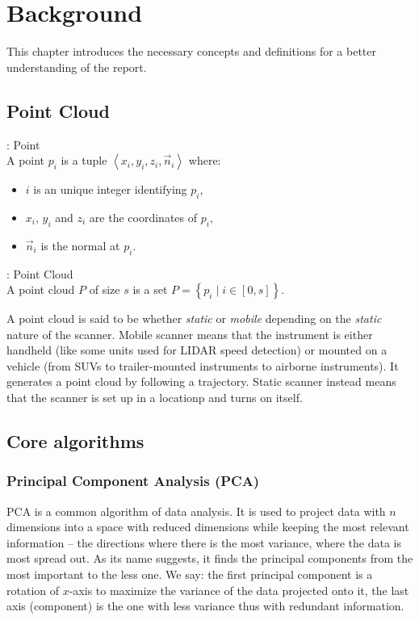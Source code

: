 \chapter{Background}
\label{ch:background}
This chapter introduces the necessary concepts and definitions for a better understanding of the report.

\section{Point Cloud}
\label{sc:back-point-cloud}
\begin{definition}{: Point}
  \\A point $p_i$ is a tuple $\left\langle x_i, y_i, z_i, \vec{n}_i \right\rangle$ where:
  \begin{itemize}
    \item $i$ is an unique integer identifying $p_i$,
    \item $x_i$, $y_i$ and $z_i$ are the coordinates of $p_i$,
    \item $\vec{n}_i$ is the normal at $p_i$.
  \end{itemize}
\end{definition}

\begin{definition}{: Point Cloud}
  \\A point cloud $P$ of size $s$ is a set $P = \left\lbrace p_i \mid i \in [0, s]  \right\rbrace$.
\end{definition}

A point cloud is said to be whether \emph{static} or \emph{mobile} depending on the \emph{static} nature of the scanner. Mobile scanner means that the instrument is either handheld (like some units used for LIDAR speed detection) or mounted on a vehicle (from SUVs to trailer-mounted instruments to airborne instruments). It generates a point cloud by following a trajectory. Static scanner instead means that the scanner is set up in a locationp and turns on itself.


\section{Core algorithms}

\subsection{Principal Component Analysis (PCA)}
\label{subsc:pca}
PCA is a common algorithm of data analysis. It is used to project data with $n$ dimensions into a space with reduced dimensions while keeping the most relevant information -- the directions where there is the most variance, where the data is most spread out. As its name suggests, it finds the principal components from the most important to the less one. We say: the first principal component is a rotation of $x$-axis to maximize the variance of the data projected onto it, the last axis
(component) is the one with less variance thus with redundant information.

